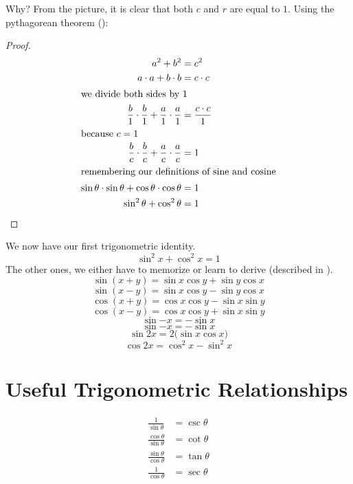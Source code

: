 Why? From the picture, it is clear that both $c$ and $r$ are equal to $1$. Using the pythagorean theorem ():
\begin{proof}\begin{align*}
  a^2+b^2&=c^2\\
  a\cdot a + b \cdot b &= c \cdot c \\
  \intertext{we divide both sides by 1}
  \frac{b}{1}\cdot\frac{b}{1}+\frac{a}{1}\cdot\frac{a}{1}
  &=\frac{c \cdot c}{1}\\
  \intertext{because $c=1$}
  \frac{b}{c}\cdot\frac{b}{c}+\frac{a}{c}\cdot\frac{a}{c}
  &=1\\
  \intertext{remembering our definitions of sine and cosine}
  \sin\theta \cdot \sin\theta + \cos\theta \cdot \cos\theta &=1\\
  \sin^2\theta + \cos^2\theta &=1\qedhere
\end{align*}\end{proof}
We now have our first trigonometric identity.
\begin{equation}
  \sin^2x+\cos^2x=1
  \label{eq:pythtrig}
\end{equation}
The other ones, we either have to memorize or learn to derive (described in ).
\begin{equation}
  \sin{(x+y)} = \sin x \cos y + \sin y \cos x
\end{equation}
\begin{equation}
  \sin{(x-y)} = \sin x \cos y - \sin y \cos x
\end{equation}
\begin{equation}
  \cos(x+y)=\cos x \cos y - \sin x \sin y
  \label{eq:cosxpy}
\end{equation}
\begin{equation}
  \cos(x-y)=\cos x \cos y + \sin x \sin y
\end{equation}
\begin{equation}
  \sin{-x}=-\sin x
\end{equation}
\begin{equation}
  \sin{-x}=-\sin x
\end{equation}
\begin{equation}
  \sin{2x}=2 \big( \sin x \cos x \big)
\end{equation}
\begin{equation}
  \cos{2x}=\cos^2x-\sin^2x
\end{equation}

\section{Useful Trigonometric Relationships}
\begin{align}
    \frac{1}{\sin\theta}&=\csc\theta \\
    \frac{\cos\theta}{\sin\theta}&=\cot\theta \\
    \frac{\sin\theta}{\cos\theta}&=\tan\theta \\
    \frac{1}{\cos\theta}&=\sec\theta
  \end{align}

